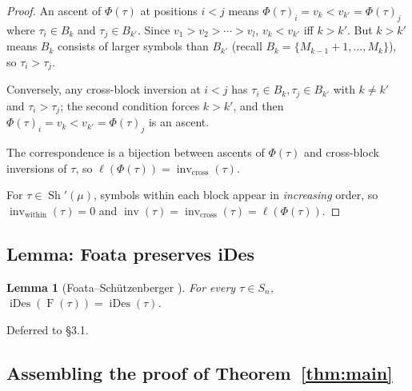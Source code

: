 \documentclass[11pt]{article}
\newtheorem{lemma}[theorem]{Lemma}
\theoremstyle{definition}
\DeclareMathOperator{\Sh}{Sh}
\DeclareMathOperator{\inv}{inv}
\DeclareMathOperator{\iDes}{iDes}
\newcommand{\Foata}{\operatorname{F}}
\newcommand{\Phimap}{\Phi}
\begin{document}
\begin{proof}
An ascent of $\Phimap(\tau)$ at positions $i < j$ means
$\Phimap(\tau)_i = v_k < v_{k'} = \Phimap(\tau)_j$ where $\tau_i \in B_k$ and
$\tau_j \in B_{k'}$.  Since $v_1 > v_2 > \cdots > v_l$, $v_k < v_{k'}$ iff
$k > k'$.  But $k > k'$ means $B_k$ consists of larger symbols than $B_{k'}$
(recall $B_k = \{M_{k-1}+1, \ldots, M_k\}$), so $\tau_i > \tau_j$.

Conversely, any cross-block inversion at $i < j$ has $\tau_i \in B_k, \tau_j
\in B_{k'}$ with $k \neq k'$ and $\tau_i > \tau_j$; the second condition
forces $k > k'$, and then $\Phimap(\tau)_i = v_k < v_{k'} = \Phimap(\tau)_j$
is an ascent.

The correspondence is a bijection between ascents of $\Phimap(\tau)$ and
cross-block inversions of $\tau$, so $\ell(\Phimap(\tau)) =
\inv_{\mathrm{cross}}(\tau)$.

For $\tau \in \Sh'(\mu)$, symbols within each block appear in
\emph{increasing} order, so $\inv_{\mathrm{within}}(\tau) = 0$ and
$\inv(\tau) = \inv_{\mathrm{cross}}(\tau) = \ell(\Phimap(\tau))$.
\end{proof}

\subsection*{Lemma: Foata preserves iDes}

\begin{lemma}[Foata--Sch\"utzenberger \cite{FS}]
\label{lem:foata-iDes}
For every $\tau \in S_n$, $\iDes(\Foata(\tau)) = \iDes(\tau)$.
\end{lemma}

Deferred to \S3.1.

\subsection*{Assembling the proof of Theorem~\ref{thm:main}}
\end{document}
